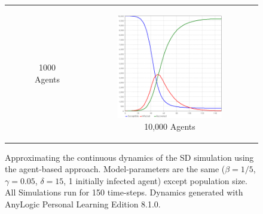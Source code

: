 \begin{figure}
\begin{center}
\begin{tabular}{c c c}
\begin{subfigure}[b]{0.3\textwidth}
			\caption{1000 Agents}
			\label{fig:pd_seq}
		\end{subfigure}
    	&
		\begin{subfigure}[b]{0.3\textwidth}
			\centering
			\includegraphics[width=.7\textwidth, angle=0]{./fig/SIR_ABS_ANYLOGIC_10000Agents.png}
			\caption{10,000 Agents}
			\label{fig:hac_seq}
		\end{subfigure}
	\end{tabular}
	
	\caption{\small Approximating the continuous dynamics of the SD simulation using the agent-based approach. Model-parameters are the same ($\beta = 1/5$, $\gamma = 0.05$, $\delta = 15$, 1 initially infected agent) except population size. All Simulations run for 150 time-steps. Dynamics generated with AnyLogic Personal Learning Edition 8.1.0.} 
	\label{fig:sir_abs_anylogic_agents}
\end{center}
\end{figure}

